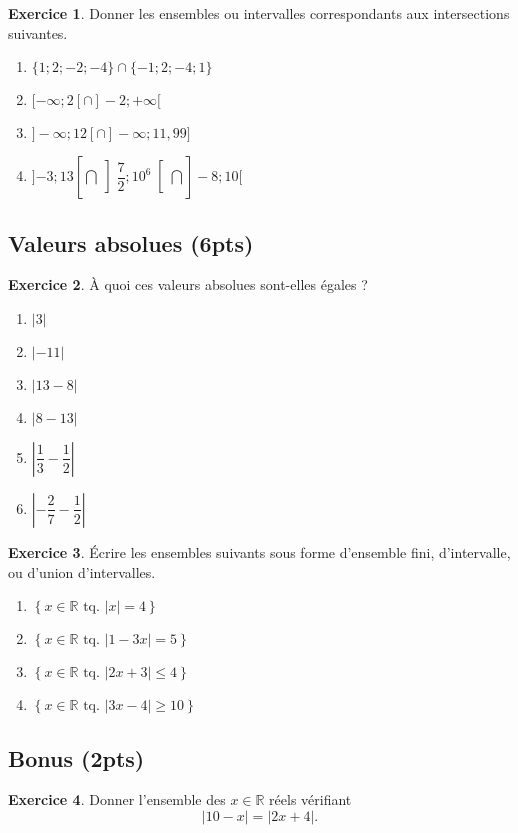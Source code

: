 \documentclass[a4paper, 14pt]{extarticle}
\theoremstyle{plain}
\theoremstyle{definition}
\newtheorem{ex}{Exercice}
\newcommand{\R}{\mathbb{R}}
\newcommand{\xRtq}[1]{
	$\left\{ x \in \R \text{ tq. } #1 \right\}$
}
\newcommand{\vabs}[1]{
	\left| #1 \right|
}
\newcommand{\pinfty}{{+}\infty}
\newcommand{\minfty}{{-}\infty}
\newcommand{\exe}[2]{
		\begin{ex} #1  \end{ex}
		\begin{sol} #2 \end{sol}
	}
\newcommand{\exe}[2]{
		\begin{ex} #1  \end{ex}
	}
\begin{document}
\exe{
	Donner les ensembles ou intervalles correspondants aux intersections suivantes.
	\begin{multicols}{2}
	\begin{enumerate}
		\item $\{ 1 ; 2 ; -2 ; -4 \} \cap \{  -1; 2 ; -4 ; 1\}$
		\item $[\minfty ; 2[ \cap ]{-}2 ; \pinfty[$
		\item $ ]\minfty ; 12[ \cap ]\minfty ; 11{,}99]$
		\item $]{-3};13[ \bigcap \left]\dfrac72; 10^6\right[ \bigcap ]{-}8; 10[$
	\end{enumerate}
	\end{multicols}
}
{


}


\subsection*{Valeurs absolues (6pts)}


\exe{
	À  quoi ces valeurs absolues sont-elles égales ?
	\begin{multicols}{2}
	\begin{enumerate}
		\item $\vabs{3}$
		\item $\vabs{-11}$
		\item $\vabs{13 - 8}$
		\item $\vabs{8-13}$
		\item $\vabs{\dfrac13 - \dfrac12}$
		\item $\vabs{-\dfrac27 - \dfrac12}$
	\end{enumerate}
	\end{multicols}
}
{


}

\exe{
	Écrire les ensembles suivants sous forme d'ensemble fini, d'intervalle, ou d'union d'intervalles.
	\begin{multicols}{2}
	\begin{enumerate}
		\item \xRtq{\vabs{x} = 4}
		\item \xRtq{\vabs{1-3x} = 5}
		\item \xRtq{\vabs{2x + 3} \leq 4}
		\item \xRtq{\vabs{3x-4} \geq 10}
	\end{enumerate}
	\end{multicols}
}
{
}

\subsection*{Bonus (2pts)}

\exe{
	Donner l'ensemble des $x\in\R$ réels vérifiant
		\[ |10 - x| = |2x + 4|. \]
}
{
}
\end{document}
